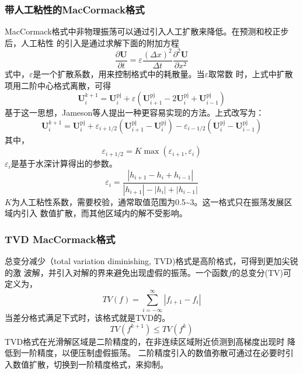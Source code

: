 \subsubsection{带人工粘性的MacCormack格式}
MacCormack格式中非物理振荡可以通过引入人工扩散来降低。在预测和校正步后，人工粘性
的引入是通过求解下面的附加方程
\begin{equation}
  \frac{\partial \mathbf{U}}{\partial t} =
  \varepsilon
  \frac{(\Delta x)^{2}}{\Delta t}
  \frac{{\partial}^{2}\mathbf{U}}{\partial x^{2}}
\end{equation}
式中，$\varepsilon$是一个扩散系数，用来控制格式中的耗散量。当$\varepsilon$取常数
时，上式中扩散项用二阶中心格式离散，可得
\begin{equation}
  \mathbf{U}_{i}^{k+1} =
  \mathbf{U}_{i}^{\mathrm{pj}} +
  \varepsilon
  (
  \mathbf{U}_{i+1}^{\mathrm{pj}} - 
  2\mathbf{U}_{i}^{\mathrm{pj}} +
  \mathbf{U}_{i-1}^{\mathrm{pj}}
  )
\end{equation}
基于这一思想，Jameson等人\cite{ref6}提出一种更容易实现的方法。上式改写为：
\begin{equation}
  \mathbf{U}_{i}^{k+1} =
  \mathbf{U}_{i}^{\mathrm{pj}} +
  {\varepsilon}_{i+1/2}
  (
  \mathbf{U}_{i+1}^{\mathrm{pj}} - 
  \mathbf{U}_{i}^{\mathrm{pj}}
  )
  -
  {\varepsilon}_{i-1/2}
  (
  \mathbf{U}_{i}^{\mathrm{pj}} -
  \mathbf{U}_{i-1}^{\mathrm{pj}}
  )
\end{equation}
其中，
\begin{equation}
  {\varepsilon}_{i+1/2} =
  K\max({\varepsilon}_{i+1},{\varepsilon}_{i})
\end{equation}
${\varepsilon}_{i}$是基于水深计算得出的参数。
\begin{equation}
  {\varepsilon}_{i} =
  \frac{|h_{i+1}-h_{i}+h_{i-1}|}{|h_{i+1}|-|h_{i}|+|h_{i-1}|}
\end{equation}
$K$为人工粘性系数，需要校验，通常取值范围为0.5\textasciitilde 3。这一格式只在振荡发展区域内引入
数值扩散，而其他区域内的解不受影响。

\subsubsection{TVD MacCormack格式}
总变分减少（total variation diminishing, TVD)格式是高阶格式，可得到更加尖锐的激
波解，并引入对解的界来避免出现虚假的振荡。一个函数$f$的总变分(TV)可定义为，
\begin{equation}
  TV(f) =
  \sum_{i=-\infty}^{\infty}
  |{f}_{i+1} - {f}_{i}|
\end{equation}
当差分格式满足下式时，该格式就是TVD的。
\begin{equation}
  TV({f}^{k+1}) \le TV({f}^{k})
\end{equation}
TVD格式在光滑解区域是二阶精度的，在非连续区域附近侦测到高梯度出现时
降低到一阶精度，以便压制虚假振荡。
二阶精度引入的数值弥散可通过在必要时引入数值扩散，切换到一阶精度格式，来抑制。

